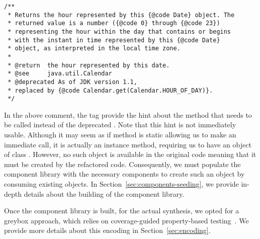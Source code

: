 \documentclass[runningheads,a4paper]{llncs}
\begin{document}
\begin{lstlisting}[mathescape=true,showstringspaces=false]
/**
 * Returns the hour represented by this {@code Date} object. The
 * returned value is a number ({@code 0} through {@code 23})
 * representing the hour within the day that contains or begins
 * with the instant in time represented by this {@code Date}
 * object, as interpreted in the local time zone.
 *
 * @return  the hour represented by this date.
 * @see     java.util.Calendar
 * @deprecated As of JDK version 1.1,
 * replaced by {@code Calendar.get(Calendar.HOUR_OF_DAY)}.
 */  
\end{lstlisting}

In the above comment, the  tag provide the hint  about the method that needs to be called instead of the deprecated .
Note that this hint is not immediately usable. Although it may seem as if
method  is static allowing us to make an immediate call,
it is actually an instance method, requiring us to have an object of
class . However, no such object is available in the
original code meaning that it must be created by the refactored code.
Consequently, we must populate the component library with the necessary
components to create such an object by consuming existing objects.
In Section~\ref{sec:components-seeding}, we provide in-depth details about the
building of the component library. 

Once the component library is built, for the actual synthesis, we opted for a greybox approach, which relies on coverage-guided property-based testing~\cite{DBLP:conf/issta/PadhyeLS19}.
We provide more details about %
this encoding in Section~\ref{sec:encoding}.

\end{document}
